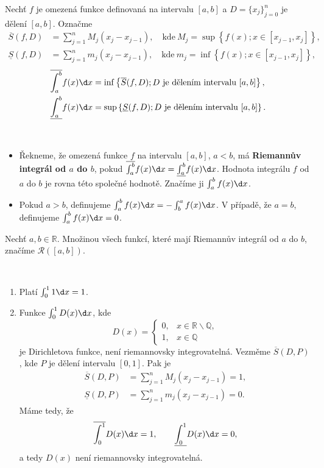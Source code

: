 \begin{definice}
Nechť $f$ je omezená funkce definovaná na intervalu $[a,b]$ a $D=\{x_j\}_{j=0}^n$ je dělení $[a,b]$.
Označme
\begin{align*}
	\overline{S}(f,D) &= \sum_{j=1}^n M_j (x_j - x_{j-1}), \quad\text{kde}\ M_j = \sup \left \{ f(x);x \in [x_{j-1},x_j] \right \} ,\\
	\underline S(f,D) &= \sum_{j=1}^n m_j (x_j - x_{j-1}), \quad\text{kde}\ m_j = \inf \left \{ f(x);x \in [x_{j-1},x_j] \right \},
\end{align*}
\begin{align*}
\overline{\int_a^b} f(x)\d x &= \inf \left \{ \overline S(f,D);D\ \text{je dělením intervalu}\ [a,b] \right \}, \\
\underline{\int_a^b} f(x)\d x &= \sup \left \{ \underline S(f,D);D\ \text{je dělením intervalu}\ [a,b] \right \}.
\end{align*}
\end{definice}

\begin{definice}\,
\begin{itemize}
	\item Řekneme, že omezená funkce $f$ na intervalu $[a,b]$, $a<b$, má \textbf{Riemannův integrál od $a$ do $b$},
pokud $\overline{\int_a^b} f(x) \d x = \underline{\int_a^b} f(x) \d x$. Hodnota integrálu $f$ od $a$ do $b$
je rovna této společné hodnotě. Značíme ji $\int_a^b f(x) \d x$.
\item Pokud $a>b$, definujeme $\int_a^b f(x) \d x = -\int_b^a f(x) \d x$. V případě, že $a=b$, definujeme
$\int_a^b f(x) \d x = 0$.
\end{itemize}
\end{definice}

\begin{definice}
Nechť $a,b \in \mathbb R $. Množinou všech funkcí, které mají Riemannův integrál od $a$ do $b$,
značíme $\mathcal R([a,b])$.
\end{definice}

\begin{poznamka}
	\,
	\begin{enumerate}[(1)]
		\item Platí $\int_0^1 1 \d x = 1$.
		\item Funkce $\int_0^1 D(x) \d x$, kde
		$$
		    D(x) = \begin{cases}
						0, & x \in \mathbb R \smallsetminus \mathbb Q,\\
						1, & x \in \mathbb Q
					\end{cases}
		$$
		je Dirichletova funkce, není riemannovsky integrovatelná. Vezměme $\overline{S}(D,P)$, kde
		$P$ je dělení intervalu $[0,1]$. Pak je
		\begin{align*}
		\overline{S}(D,P) &= \sum _{j=1}^n M_j(x_j-x_{j-1})=1,\\
		\underline{S}(D,P) &= \sum_{j=1}^n m_j(x_j-x_{j-1}) = 0.
		\end{align*}
		Máme tedy, že
		$$
		    \overline{\int_0^1} D(x)\d x = 1, \qquad \underline{\int_0^1} D(x) \d x = 0,
		$$
		a tedy $D(x)$ není riemannovsky integrovatelná.
	\end{enumerate}
\end{poznamka}

